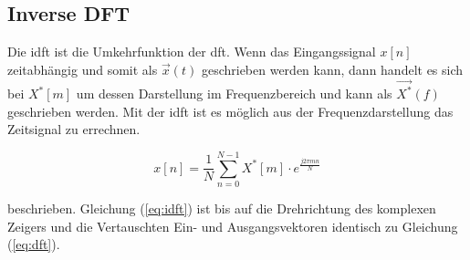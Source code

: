 \subsection{Inverse DFT}

Die \gls{idft} ist die Umkehrfunktion der \gls{dft}. Wenn das Eingangssignal $x[n]$ zeitabhängig und somit als $\vec{x}(t)$ geschrieben werden kann, dann handelt es sich bei $X^*[m]$ um
dessen Darstellung im Frequenzbereich und kann als $\vec{X^*}(f)$ geschrieben werden. Mit der \gls{idft} ist es möglich aus der Frequenzdarstellung das Zeitsignal zu errechnen.

\begin{equation}\label{eq:idft}
 x \left[ n \right] = \frac{1}{N} \sum^{N-1}_{n=0} X^*[m] \cdot e^{\frac{j 2 \pi m n}{N}}
\end{equation}

beschrieben. Gleichung (\ref{eq:idft}) ist bis auf die Drehrichtung des komplexen Zeigers und die Vertauschten Ein- und Ausgangsvektoren identisch zu Gleichung (\ref{eq:dft}).